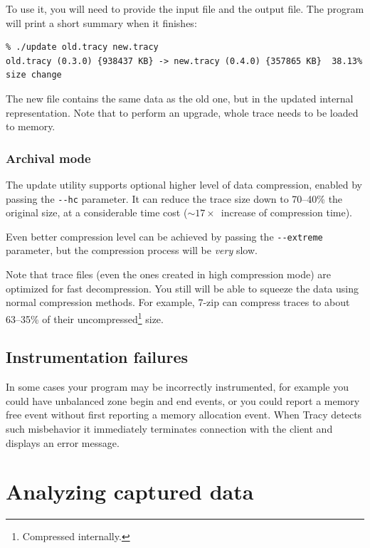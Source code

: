 \documentclass[hidelinks,titlepage,a4paper]{article}
\begin{document}
To use it, you will need to provide the input file and the output file. The program will print a short summary when it finishes:

\begin{verbatim}
% ./update old.tracy new.tracy
old.tracy (0.3.0) {938437 KB} -> new.tracy (0.4.0) {357865 KB}  38.13% size change
\end{verbatim}

The new file contains the same data as the old one, but in the updated internal representation. Note that to perform an upgrade, whole trace needs to be loaded to memory.

\subsubsection{Archival mode}

The update utility supports optional higher level of data compression, enabled by passing the \texttt{-{}-hc} parameter. It can reduce the trace size down to \numrange{70}{40}\% the original size, at a considerable time cost ($\sim17\times$~increase of compression time).

Even better compression level can be achieved by passing the \texttt{-{}-extreme} parameter, but the compression process will be \emph{very} slow.

Note that trace files (even the ones created in high compression mode) are optimized for fast decompression. You still will be able to squeeze the data using normal compression methods. For example, 7-zip can compress traces to about \numrange{63}{35}\% of their uncompressed\footnote{Compressed internally.} size.

\subsection{Instrumentation failures}
\label{instrumentationfailures}

In some cases your program may be incorrectly instrumented, for example you could have unbalanced zone begin and end events, or you could report a memory free event without first reporting a memory allocation event. When Tracy detects such misbehavior it immediately terminates connection with the client and displays an error message.

\section{Analyzing captured data}
\label{analyzingdata}
\end{document}
